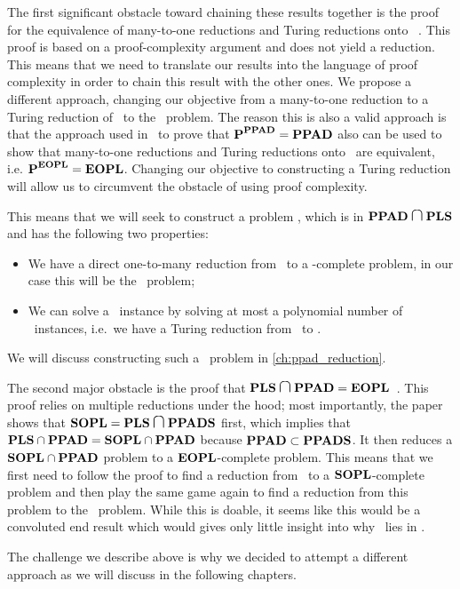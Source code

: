 The first significant obstacle toward chaining these results together is the proof for the equivalence of many-to-one reductions and Turing reductions onto \PPAD\ . This proof is based on a proof-complexity argument and does not yield a reduction. This means that we need to translate our results into the language of proof complexity in order to chain this result with the other ones. We propose a different approach, changing our objective from a many-to-one reduction to a Turing reduction of \Tarski\ to the \EndOfPotentialLine\ problem. The reason this is also a valid approach is that the approach used in~\cite{buss_propositional_2012} to prove that $\textbf{P}^{\textbf{PPAD}} = \textbf{PPAD}$ also can be used to show that many-to-one reductions and Turing reductions onto \EOPL\ are equivalent, i.e. $\textbf{P}^{\textbf{EOPL}} = \textbf{EOPL}$. Changing our objective to constructing a Turing reduction will allow us to circumvent the obstacle of using proof complexity.

This means that we will seek to construct a problem \Tarskistar, which is in $\PPAD  \medcap \PLS$ and has the following two properties:
\begin{itemize}
	\item We have a direct one-to-many reduction from \Tarskistar\ to a \PPAD-complete problem, in our case this will be the \EndOfLine\ problem;
	\item We can solve a \Tarski\ instance by solving at most a polynomial number of \Tarskistar\ instances, i.e.\ we have a Turing reduction from \Tarski\ to \Tarskistar.
\end{itemize}
We will discuss constructing such a \Tarskistar\ problem in \cref{ch:ppad_reduction}.

The second major obstacle is the proof that $\PLS \medcap \PPAD = \EOPL$~. This proof relies on multiple reductions under the hood; most importantly, the paper shows that $\SOPL = \PLS \medcap \PPADS$ first, which implies that $\textbf{PLS} \cap \textbf{PPAD} =  \textbf{SOPL} \cap \textbf{PPAD}$ because $\textbf{PPAD} \subset \textbf{PPADS}$. It then reduces a $\textbf{SOPL} \cap \textbf{PPAD}$ problem to a $\textbf{EOPL}$-complete problem. This means that we first need to follow the proof to find a reduction from \Tarskistar\ to a $\textbf{SOPL}$-complete problem and then play the same game again to find a reduction from this problem to the \EndOfPotentialLine\ problem. While this is doable, it seems like this would be a convoluted end result which would gives only little insight into why \Tarski\ lies in \EOPL\@.

The challenge we describe above is why we decided to attempt a different approach as we will discuss in the following chapters.
